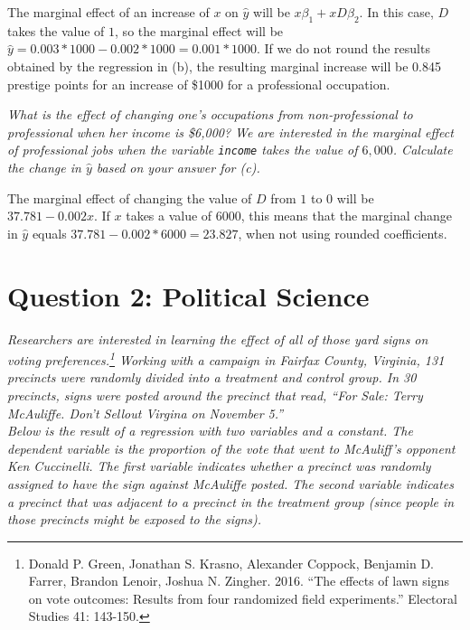 \documentclass[12pt,a4paper]{article}
\begin{document}
\noindent The marginal effect of an increase of $x$ on $\hat{y}$ will be $x\beta_1 + xD\beta_2$. In this case, $D$ takes the value of $1$, so the marginal effect will be $\hat{y} = 0.003*1000 - 0.002*1000 = 0.001*1000$. If we do not round the results obtained by the regression in (b), the resulting marginal increase will be 0.845 prestige points for an increase of \$1000 for a professional occupation.

\vspace{.5cm}
\textit{\noindent What is the effect of changing one's occupations from non-professional to professional when her income is \$6,000? We are interested in the marginal effect of professional jobs when the variable \texttt{income} takes the value of $6,000$. Calculate the change in $\hat{y}$ based on your answer for (c).}
\vspace{.25cm}

\noindent The marginal effect of changing the value of $D$ from $1$ to $0$ will be $37.781 - 0.002x$. If $x$ takes a value of $6000$, this means that the marginal change in $\hat{y}$ equals $37.781 - 0.002*6000 = 23.827$, when not using rounded coefficients.

\newpage

\section*{Question 2: Political Science}
\vspace{.25cm}
\textit{\noindent 	Researchers are interested in learning the effect of all of those yard signs on voting preferences.\footnote{Donald P. Green, Jonathan	S. Krasno, Alexander Coppock, Benjamin D. Farrer,	Brandon Lenoir, Joshua N. Zingher. 2016. ``The effects of lawn signs on vote outcomes: Results from four randomized field experiments.'' Electoral Studies 41: 143-150. } Working with a campaign in Fairfax County, Virginia, 131 precincts were randomly divided into a treatment and control group. In 30 precincts, signs were posted around the precinct that read, ``For Sale: Terry McAuliffe. Don't Sellout Virgina on November 5.''} \\

\textit{\noindent Below is the result of a regression with two variables and a constant.  The dependent variable is the proportion of the vote that went to McAuliff's opponent Ken Cuccinelli. The first variable indicates whether a precinct was randomly assigned to have the sign against McAuliffe posted. The second variable indicates a precinct that was adjacent to a precinct in the treatment group (since people in those precincts might be exposed to the signs).  \\}
\end{document}
